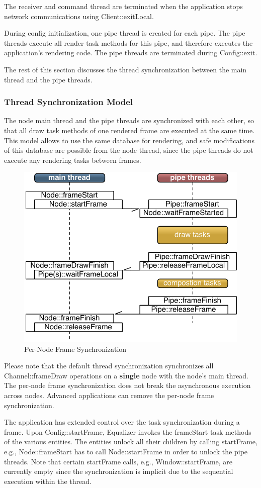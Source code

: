 \documentclass[10pt,a4]{scrartcl}
\begin{document}
The receiver and command thread are terminated when the application
stops network communications using \textsf{Client::exitLocal}.

During config initialization, one pipe thread is created for each
pipe. The pipe threads execute all render task methods for this pipe,
and therefore executes the application's rendering code. The pipe
threads are terminated during \textsf{Config::exit}.

The rest of this section discusses the thread synchronization between
the main thread and the pipe threads.


\subsubsection{\label{sNodeFrame}Thread Synchronization Model}

The node main thread and the pipe threads are synchronized with each
other, so that all draw task methods of one rendered frame are executed
at the same time. This model allows to use the same database for
rendering, and safe modifications of this database are possible from the
node thread, since the pipe threads do not execute any rendering tasks
between frames.

\begin{figure}
  \includegraphics[width=.618\textwidth]{images/frameSync.pdf}
  {\caption{\small\label{fFrameSync}Per-Node Frame Synchronization}}
\end{figure}
Please note that the default thread synchronization synchronizes all
\textsf{Channel::frame\-Draw} operations on a \textbf{single} node with
the node's main thread. The per-node frame synchronization does not
break the asynchronous execution across nodes. Advanced applications can
remove the per-node frame synchronization.

The application has extended control over the task synchronization
during a frame. Upon \textsf{Config::startFrame}, Equalizer invokes the
\textsf{frameStart} task methods of the various entities. The entities
unlock all their children by calling \textsf{startFrame}, e.g.,
\textsf{Node::frameStart} has to call \textsf{Node::startFrame} in order
to unlock the pipe threads. Note that certain \textsf{startFrame} calls,
e.g., \textsf{Window::startFrame}, are currently empty since the
synchronization is implicit due to the sequential execution within the
thread.
\end{document}
